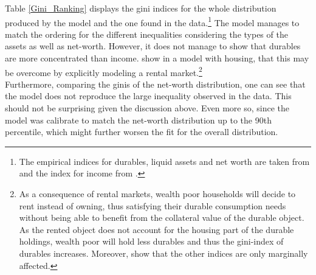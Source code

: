 \documentclass[a4paper,12pt,legno]{article}
\begin{document}
Table \ref{Gini_Ranking} displays the gini indices for the whole distribution produced by the model and the one found in the data.\footnote{The empirical indices for durables, liquid assets and net worth are taken from \cite{hintermaier2010} and the index for income from \cite{hintermaier2011}.} The model manages to match the ordering for the different inequalities considering the types of the assets as well as net-worth. However, it does not manage to show that durables are more concentrated than income. \cite{diaz2010} show in a model with housing, that this may be overcome by explicitly modeling a rental market.\footnote{As a consequence of rental markets, wealth poor households will decide to rent instead of owning, thus satisfying their durable consumption needs without being able to benefit from the collateral value of the durable object. As the rented object does not account for the housing part of the durable holdings, wealth poor will hold less durables and thus the gini-index of durables increases. Moreover, \cite{diaz2010} show that the other indices are only marginally affected.} \\
Furthermore, comparing the ginis of the net-worth distribution, one can see that the model does not reproduce the large inequality observed in the data. This should not be surprising given the discussion above. Even more so, since the model was calibrate to match the net-worth distribution up to the 90th percentile, which might further worsen the fit for the overall distribution.  
\end{document}
